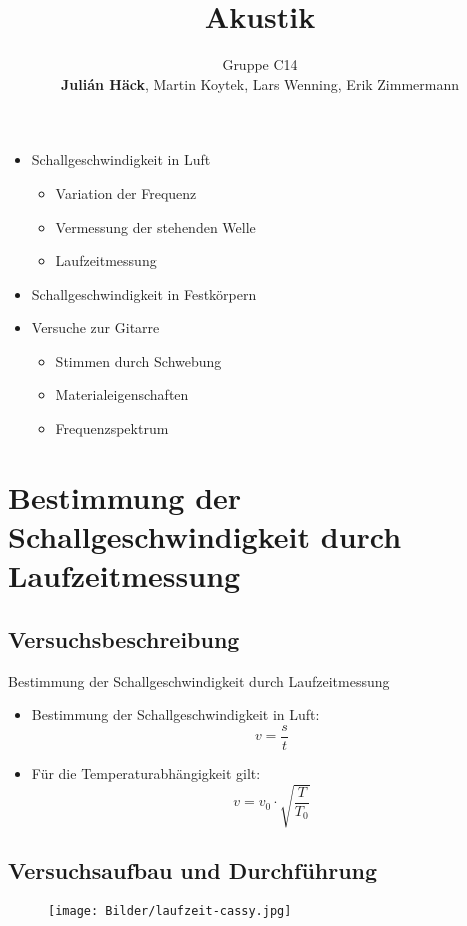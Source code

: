 \documentclass[11pt]{beamer}
\author{Gruppe C14 \\ \textbf{Julián Häck}, Martin Koytek, Lars Wenning, Erik Zimmermann}
\title{Akustik}
\begin{document}
\begin{frame}
\titlepage
\end{frame}

\begin{frame}
\begin{itemize}
\item Schallgeschwindigkeit in Luft
\begin{itemize}
\item Variation der Frequenz
\item Vermessung der stehenden Welle
\item Laufzeitmessung
\end{itemize}
\item Schallgeschwindigkeit in Festkörpern
\item Versuche zur Gitarre
\begin{itemize}
\item Stimmen durch Schwebung
\item Materialeigenschaften
\item Frequenzspektrum
\end{itemize}
\end{itemize}
\end{frame}

\section{Bestimmung der Schallgeschwindigkeit durch Laufzeitmessung}
\subsection{Versuchsbeschreibung}
\begin{frame}{Bestimmung der Schallgeschwindigkeit durch Laufzeitmessung}
\begin{itemize}
\item Bestimmung der Schallgeschwindigkeit in Luft:
\begin{equation*}
v=\frac{s}{t}
\end{equation*}
\item Für die Temperaturabhängigkeit gilt:
\begin{equation*}
v=v_0\cdot \sqrt{\frac{T}{T_0}} 
\end{equation*}
\end{itemize} 
\end{frame}
\subsection{Versuchsaufbau und Durchführung}
\begin{frame}
\begin{figure}[H]
\centering
\texttt{[image: Bilder/laufzeit-cassy.jpg]}
\end{figure}
\end{frame}
\end{document}
